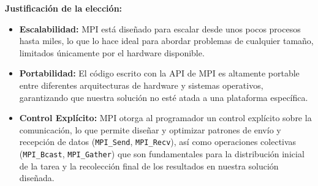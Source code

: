 \documentclass[fleqn,10pt]{article}
\begin{document}
\textbf{Justificación de la elección:}
\begin{itemize}
    \item \textbf{Escalabilidad:} MPI está diseñado para escalar desde unos pocos procesos hasta miles, lo que lo hace ideal para abordar problemas de cualquier tamaño, limitados únicamente por el hardware disponible.
    \item \textbf{Portabilidad:} El código escrito con la API de MPI es altamente portable entre diferentes arquitecturas de hardware y sistemas operativos, garantizando que nuestra solución no esté atada a una plataforma específica.
    \item \textbf{Control Explícito:} MPI otorga al programador un control explícito sobre la comunicación, lo que permite diseñar y optimizar patrones de envío y recepción de datos (\texttt{MPI\_Send}, \texttt{MPI\_Recv}), así como operaciones colectivas (\texttt{MPI\_Bcast}, \texttt{MPI\_Gather}) que son fundamentales para la distribución inicial de la tarea y la recolección final de los resultados en nuestra solución diseñada.
\end{itemize}
\end{document}
